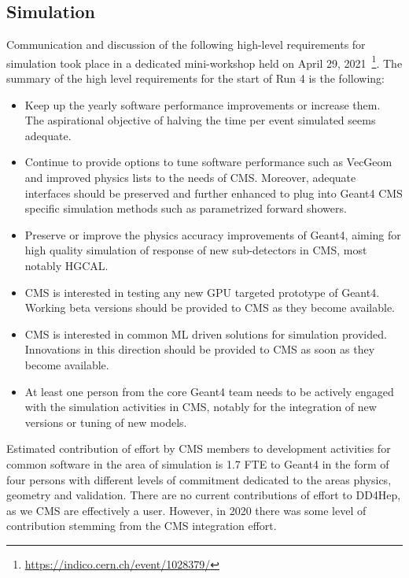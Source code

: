 \subsection{Simulation}
Communication and discussion of the following high-level requirements for simulation took place in a dedicated mini-workshop held on April 29, 2021~\footnote{\url{https://indico.cern.ch/event/1028379/}}.
The summary of the high level requirements for the start of Run 4 is the following:
\begin{itemize}
    \item Keep up the yearly software performance improvements or increase them. The aspirational objective of halving the time per event simulated seems adequate.
    \item Continue to provide options to tune software performance such as VecGeom~\cite{Wenzel:2754098} and improved physics lists to the needs of CMS. Moreover, adequate interfaces should be preserved and further enhanced to plug into Geant4 CMS specific simulation methods such as parametrized forward showers.
    \item Preserve or improve the physics accuracy improvements of Geant4, aiming for high quality simulation of response of new sub-detectors in CMS, most notably HGCAL.
    \item CMS is interested in testing any new GPU targeted prototype of Geant4. Working beta versions should be provided to CMS as they become available.
    \item CMS is interested in common ML driven solutions for simulation provided. Innovations in this direction should be provided to CMS as soon as they become available.
    \item At least one person from the core Geant4 team needs to be actively engaged with the simulation activities in CMS, notably for the integration of new versions or tuning of new models.
\end{itemize}

Estimated contribution of effort by CMS members to  development activities for common software in the area of simulation is 1.7 FTE to Geant4 in the form of four persons with different levels of commitment dedicated to the areas physics, geometry and validation. There are no current contributions of effort to DD4Hep, as we CMS are effectively a user. However, in 2020 there was some level of contribution stemming from the CMS integration effort.

